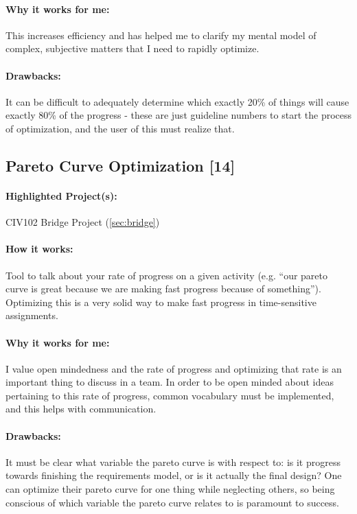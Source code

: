 \documentclass[a4paper,12pt]{article}
\begin{document}
\paragraph{Why it works for me: }
This increases efficiency and has helped me to clarify my mental model of complex, subjective matters that I need to rapidly optimize.

\paragraph{Drawbacks: }
It can be difficult to adequately determine which exactly 20\% of things will cause exactly 80\% of the progress - these are just guideline numbers to start the process of optimization, and the user of this must realize that.

\subsection{Pareto Curve Optimization [14]}
\label{sec:pareto}
\paragraph{Highlighted Project(s): } CIV102 Bridge Project (\ref{sec:bridge})

\paragraph{How it works: }
Tool to talk about your rate of progress on a given activity (e.g. “our pareto curve is great because we are making fast progress because of {something}”). Optimizing this is a very solid way to make fast progress in time-sensitive assignments.


\paragraph{Why it works for me: }
I value open mindedness and the rate of progress and optimizing that rate is an important thing to discuss in a team. In order to be open minded about ideas pertaining to this rate of progress, common vocabulary must be implemented, and this helps with communication.


\paragraph{Drawbacks: }
It must be clear what variable the pareto curve is with respect to: is it progress towards finishing the requirements model, or is it actually the final design? One can optimize their pareto curve for one thing while neglecting others, so being conscious of which variable the pareto curve relates to is paramount to success.
\end{document}
